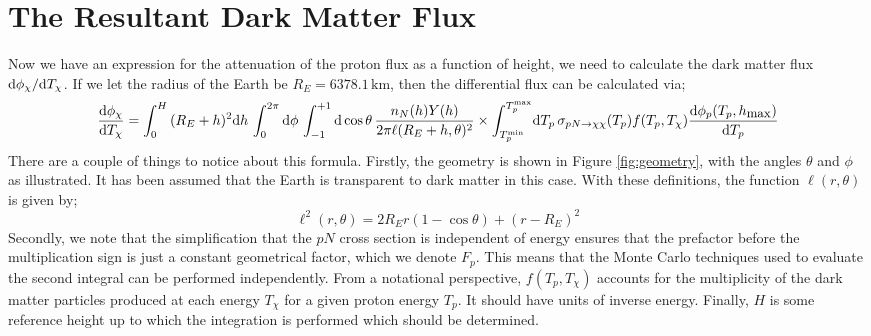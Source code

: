 \documentclass[10pt]{article}
\begin{document}
\section{The Resultant Dark Matter Flux}
Now we have an expression for the attenuation of the proton flux as a function of height, we need to calculate the dark matter flux $\text{d} \phi_\chi/\text{d} T_\chi$. If we let the radius of the Earth be $R_E = 6378.1 \, \textrm{km}$, then the differential flux can be calculated via;
\begin{multline}
  \frac{\text{d} \phi_\chi}{\text{d} T_\chi} = \int_{0}^{H}{(R_E + h)^2\text{d}h \,\int_0^{2\pi}{\text{d}\phi \, \int_{-1}^{+1}{\text{d}\cos\theta \,\frac{n_N(h)Y(h)}{2\pi \ell(R_E + h, \theta)^2}}}\times \int_{T_p^{\textrm{\tiny min}}}^{T_p^{\textrm{\tiny max}}}}{\text{d}T_p \, \sigma_{pN\rightarrow \chi\chi}(T_p)f(T_p, T_\chi)\frac{\text{d} \phi_p(T_p, h_{\textrm{\small max}})}{\text{d} T_p}}
\end{multline}
There are a couple of things to notice about this formula. Firstly, the geometry is shown in Figure \ref{fig:geometry}, with the angles $\theta$ and $\phi$ as illustrated. It has been assumed that the Earth is transparent to dark matter in this case. With these definitions, the function $\ell(r, \theta)$ is given by;
\begin{equation}
  \ell^2(r, \theta) = 2 R_E r (1 - \cos\theta) + (r - R_E)^2
\end{equation}
Secondly, we note that the simplification that the $pN$ cross section is independent of energy ensures that the prefactor before the multiplication sign is just a constant geometrical factor, which we denote $F_p$. This means that the Monte Carlo techniques used to evaluate the second integral can be performed independently. From a notational perspective, $f(T_p, T_\chi)$ accounts for the multiplicity of the dark matter particles produced at each energy $T_\chi$ for a given proton energy $T_p$. It should have units of inverse energy. Finally, $H$ is some reference height up to which the integration is performed which should be determined.
\end{document}
